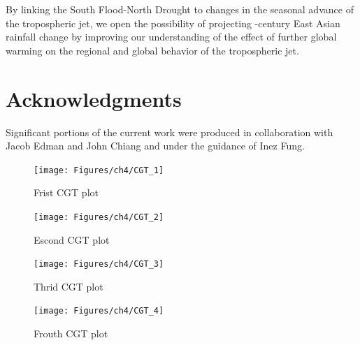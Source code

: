  By linking the South Flood-North Drought to changes in the seasonal advance of the tropospheric jet, we open the possibility of projecting -century East Asian rainfall change by improving our understanding of the effect of further global warming on the regional and global behavior of the tropospheric jet.
	
	
\section{Acknowledgments}

	Significant portions of the current work were produced in collaboration with Jacob Edman and John Chiang and under the guidance of Inez Fung.


\begin{figure}
\centering
\noindent\texttt{[image: Figures/ch4/CGT\_1]}
\caption{Frist CGT plot}
\label{fig:cgt1}
\end{figure}

\begin{figure}
\centering
\noindent\texttt{[image: Figures/ch4/CGT\_2]}
\caption{Escond CGT plot}
\label{fig:cgt2}
\end{figure}

\begin{figure}
\centering
\noindent\texttt{[image: Figures/ch4/CGT\_3]}
\caption{Thrid CGT plot}
\label{fig:cgt3}
\end{figure}

\begin{figure}
\centering
\noindent\texttt{[image: Figures/ch4/CGT\_4]}
\caption{Frouth CGT plot}
\label{fig:cgt4}
\end{figure}

